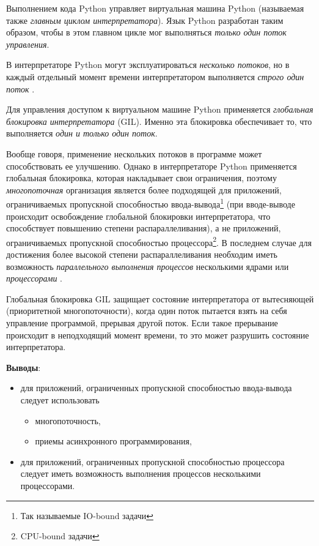 \documentclass[%
	11pt,
	a4paper,
	utf8,
		]{article}
\begin{document}
Выполнением кода Python управляет виртуальная машина Python (называемая также \emph{главным циклом интерпретатора}). Язык Python разработан таким образом, чтобы в этом главном цикле мог выполняться \emph{только один поток управления}.

В интерпретаторе Python могут эксплуатироваться \emph{несколько потоков}, но в каждый отдельный момент времени интерпретатором выполняется \emph{строго один поток} \cite[]{chun:2015}.

Для управления доступом к виртуальном машине Python применяется \emph{глобальная блокировка интерпретатора} (GIL). Именно эта блокировка обеспечивает то, что выполняется \emph{один и только один поток}.

Вообще говоря, применение нескольких потоков в программе может способствовать ее улучшению. Однако в интерпретаторе Python применяется глобальная блокировка, которая накладывает свои ограничения, поэтому \emph{многопоточная} организация является более подходящей для приложений, ограничиваемых пропускной способностью ввода-вывода\footnote{Так называемые IO-bound задачи} (при вводе-выводе происходит освобождение глобальной блокировки интерпретатора, что способствует повышению степени распараллеливания), а не приложений, ограничиваемых пропускной способностью процессора\footnote{CPU-bound задачи}. В последнем случае для достижения более высокой степени распараллеливания необходим иметь возможность \emph{параллельного выполнения процессов} несколькими ядрами или \emph{процессорами} \cite[]{chun:2015}.

Глобальная блокировка GIL защищает состояние интерпретатора от вытесняющей (приоритетной многопоточности), когда один поток пытается взять на себя управление программой, прерывая другой поток. Если такое прерывание происходит в неподходящий момент времени, то это может разрушить состояние интерпретатора.

\textbf{Выводы}:
\begin{itemize}
	\item для приложений, ограниченных пропускной способностью ввода-вывода следует использовать
	\begin{itemize}
		\item многопоточность,
		
		\item приемы асинхронного программирования,
	\end{itemize}

    \item для приложений, ограниченных пропускной способностью процессора следует иметь возможность выполнения процессов несколькими процессорами.
\end{itemize}
\end{document}
